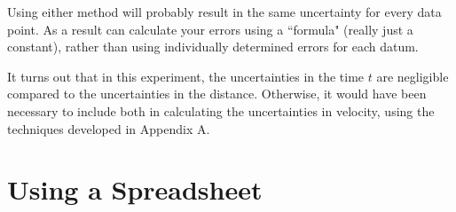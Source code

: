 Using either method will probably result in the same uncertainty
for every data point.  As a result \WAPP can calculate your
errors using a ``formula" (really just a constant), rather than using
individually determined errors for each datum.


It turns out that in this experiment, the uncertainties in the time
$t$
are negligible compared to the uncertainties in the distance.
Otherwise, it would have been necessary to include both in calculating
the uncertainties in velocity, using the techniques developed in
Appendix A.

%
%


\section*{Using a Spreadsheet}


